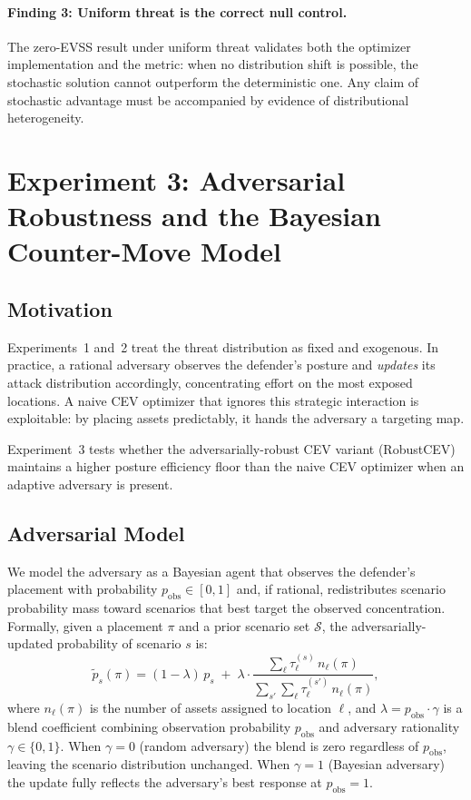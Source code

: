 \documentclass[11pt]{article}
\begin{document}
\paragraph{Finding 3: Uniform threat is the correct null control.}
The zero-EVSS result under uniform threat validates both the optimizer
implementation and the metric: when no distribution shift is possible,
the stochastic solution cannot outperform the deterministic one.
Any claim of stochastic advantage must be accompanied by evidence of
distributional heterogeneity.


\section{Experiment 3: Adversarial Robustness and the Bayesian Counter-Move Model}
\label{sec:exp3}

\subsection{Motivation}

Experiments~1 and~2 treat the threat distribution as fixed and exogenous.
In practice, a rational adversary observes the defender's posture and
\emph{updates} its attack distribution accordingly, concentrating
effort on the most exposed locations.  A naive CEV optimizer that
ignores this strategic interaction is exploitable: by placing assets
predictably, it hands the adversary a targeting map.

Experiment~3 tests whether the adversarially-robust CEV variant
(RobustCEV) maintains a higher posture efficiency floor than the naive
CEV optimizer when an adaptive adversary is present.

\subsection{Adversarial Model}
\label{sec:exp3:model}

We model the adversary as a Bayesian agent that observes the
defender's placement with probability $p_\mathrm{obs} \in [0, 1]$
and, if rational, redistributes scenario probability mass toward
scenarios that best target the observed concentration.
Formally, given a placement $\pi$ and a prior scenario set
$\mathcal{S}$, the adversarially-updated probability of scenario $s$ is:
\begin{equation}
    \tilde{p}_s(\pi) =
    (1 - \lambda)\, p_s
    \;+\;
    \lambda \cdot
    \frac{\displaystyle\sum_{\ell} \tau_\ell^{(s)}\, n_\ell(\pi)}
         {\displaystyle\sum_{s'} \sum_{\ell} \tau_\ell^{(s')}\, n_\ell(\pi)},
    \label{eq:adv_update}
\end{equation}
where $n_\ell(\pi)$ is the number of assets assigned to location $\ell$,
and $\lambda = p_\mathrm{obs} \cdot \gamma$ is a blend coefficient
combining observation probability $p_\mathrm{obs}$ and adversary
rationality $\gamma \in \{0, 1\}$.  When $\gamma = 0$ (random adversary)
the blend is zero regardless of $p_\mathrm{obs}$, leaving the scenario
distribution unchanged.  When $\gamma = 1$ (Bayesian adversary) the
update fully reflects the adversary's best response at $p_\mathrm{obs} = 1$.
\end{document}
